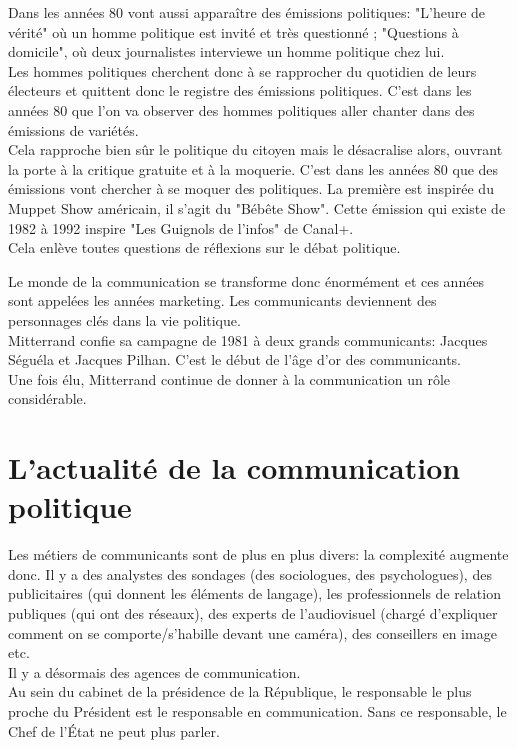 \documentclass[12pt, a4paper, openany]{book}
\begin{document}
Dans les années 80 vont aussi apparaître des émissions politiques: "L'heure de vérité" où un homme politique est invité et très questionné ; "Questions à domicile", où deux journalistes interviewe un homme politique chez lui. \\
Les hommes politiques cherchent donc à se rapprocher du quotidien de leurs électeurs et quittent donc le registre des émissions politiques. C'est dans les années 80 que l'on va observer des hommes politiques aller chanter dans des émissions de variétés. \\
Cela rapproche bien sûr le politique du citoyen mais le désacralise alors, ouvrant la porte à la critique gratuite et à la moquerie. C'est dans les années 80 que des émissions vont chercher à se moquer des politiques. La première est inspirée du Muppet Show américain, il s'agit du "Bébête Show". Cette émission qui existe de 1982 à 1992 inspire "Les Guignols de l'infos" de Canal+. \\
Cela enlève toutes questions de réflexions sur le débat politique.


Le monde de la communication se transforme donc énormément et ces années sont appelées les années marketing. Les communicants deviennent des personnages clés dans la vie politique. \\
Mitterrand confie sa campagne de 1981 à deux grands communicants: Jacques Séguéla et Jacques Pilhan. C'est le début de l'âge d'or des communicants. \\
Une fois élu, Mitterrand continue de donner à la communication un rôle considérable. 

\section{L'actualité de la communication politique}

Les métiers de communicants sont de plus en plus divers: la complexité augmente donc. Il y a des analystes des sondages (des sociologues, des psychologues), des publicitaires (qui donnent les éléments de langage), les professionnels de relation publiques (qui ont des réseaux), des experts de l'audiovisuel (chargé d'expliquer comment on se comporte/s'habille devant une caméra), des conseillers en image etc. \\
Il y a désormais des agences de communication. \\
Au sein du cabinet de la présidence de la République, le responsable le plus proche du Président est le responsable en communication. Sans ce responsable, le Chef de l'État ne peut plus parler. 
\end{document}
